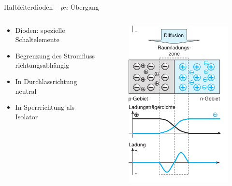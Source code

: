 \documentclass[12pt%
,aspectratio=169%
]{beamer}
\begin{document}
\begin{frame}{Halbleiterdioden -- $pn$-Übergang}
\begin{columns}[T] %
\begin{column}{.48\textwidth}
\begin{itemize}
	\item Dioden: spezielle Schaltelemente
	\item Begrenzung des Stromﬂuss richtungsabhängig
	\item In Durchlassrichtung neutral
	\item In Sperrrichtung als Isolator
\end{itemize}
\end{column}%
\hfill%
\begin{column}{.48\textwidth}
\begin{figure}
\center
\includegraphics[scale=0.3]{pictures/halbleiterdiode2}
\end{figure}
\end{column}%
\end{columns}
\end{frame}
\end{document}
